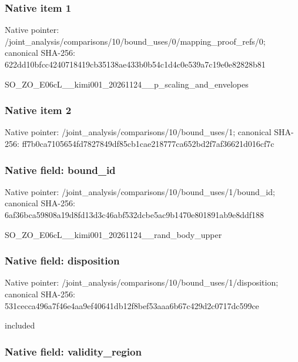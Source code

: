 \documentclass[10pt,a4paper]{article}
\begin{document}
\subsubsection{Native item 1}


Native pointer: /joint\_analysis/comparis\allowbreak{}ons/10/bound\_uses/0/mapp\allowbreak{}ing\_proof\_refs/0; canonical SHA-256: 622dd10bfcc4240718419cb3\allowbreak{}5138ae433b0b54c1d4c0e539\allowbreak{}a7c19e0e82828b81


SO\_ZO\_E06cL\_\_kimi001\_202\allowbreak{}61124\_\_p\_scaling\_and\_env\allowbreak{}elopes


\subsubsection{Native item 2}


Native pointer: /joint\_analysis/comparis\allowbreak{}ons/10/bound\_uses/1; canonical SHA-256: ff7b0ca7105654fd7827849d\allowbreak{}f85cb1cae218777ca652bd2f\allowbreak{}7af36621d016cf7c



\subsubsection{Native field: bound\_id}


Native pointer: /joint\_analysis/comparis\allowbreak{}ons/10/bound\_uses/1/boun\allowbreak{}d\_id; canonical SHA-256: 6af36bca59808a19d8fd13d3\allowbreak{}c46abf532dcbe5ac9b1470e8\allowbreak{}01891ab9e8ddf188


SO\_ZO\_E06cL\_\_kimi001\_202\allowbreak{}61124\_\_rand\_body\_upper


\subsubsection{Native field: disposition}


Native pointer: /joint\_analysis/comparis\allowbreak{}ons/10/bound\_uses/1/disp\allowbreak{}osition; canonical SHA-256: 531cecca496a7f46e4aa9ef4\allowbreak{}0641db12f8bef53aaa6b67c4\allowbreak{}29d2c0717dc599ce


included


\subsubsection{Native field: validity\_region}
\end{document}
